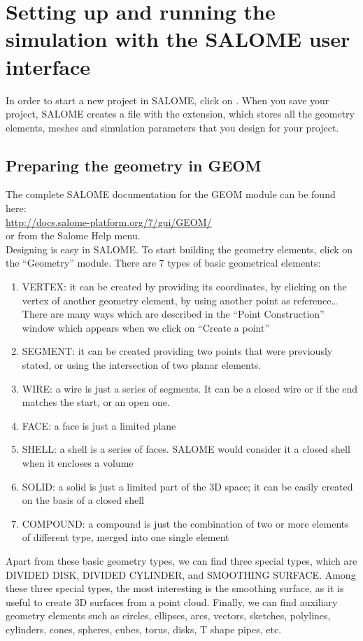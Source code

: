\documentclass{../GPUSPHtemplate}
\begin{document}
\section{Setting up and running the simulation with the SALOME user interface}

In order to start a new project in SALOME, click on . 
When you save your project, SALOME creates a file with the 
 extension, which stores all the geometry elements, 
meshes and simulation parameters that you design for your project.

\subsection{Preparing the geometry in GEOM}

The complete SALOME documentation for the GEOM module can be found here:\\
\url{http://docs.salome-platform.org/7/gui/GEOM/}\\
or from the Salome Help menu.\\

Designing is easy in SALOME. To start building the geometry 
elements, click on the “Geometry” module. 
There are 7 types of basic geometrical elements:
\begin{enumerate}
\item VERTEX: it can be created by providing its coordinates, 
by clicking on the vertex of another geometry element, 
by using another point as reference…There are many ways 
which are described in the “Point Construction” window 
which appears when we click on “Create a point”
\item SEGMENT: it can be created providing two points 
that were previously stated, or using the intersection of 
two planar elements. 
\item WIRE: a wire is just a series of segments. 
It can be a closed wire or if the end matches the start, 
or an open one.
\item FACE: a face is just a limited plane 
\item SHELL: a shell is a series of faces. 
SALOME would consider it a closed shell when it 
encloses a volume
\item SOLID: a solid is just a limited part of the 3D space; 
it can be easily created on the basis of a closed shell
\item COMPOUND: a compound is just the combination 
of two or more elements of different type, merged 
into one single element
\end{enumerate}
Apart from these basic geometry types, we can find 
three special types, which are 
DIVIDED DISK, DIVIDED CYLINDER, and SMOOTHING SURFACE. 
Among these three special types, the most interesting 
is the smoothing surface, as it is useful to create 
3D surfaces from a point cloud.
Finally, we can find auxiliary geometry elements such as 
circles, ellipses, arcs, vectors, sketches, polylines, cylinders, 
cones, spheres, cubes, torus, disks, T shape pipes, etc.
\end{document}
